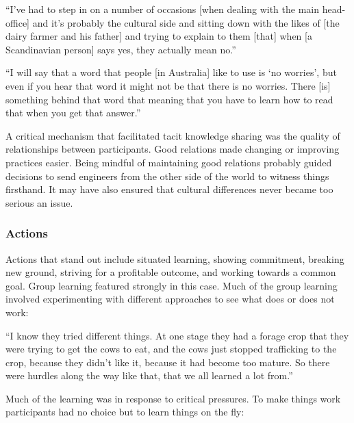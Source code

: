 \begin{displayquote}[Participant 18/2]
\small
\enquote{I've had to step in on a number of occasions [when dealing with the main head-office] and it's probably the cultural side and sitting down with the likes of [the dairy farmer and his father] and trying to explain to them [that] when [a Scandinavian person] says yes, they actually mean no.} 
\end{displayquote}


\begin{displayquote}[Participant 24/2]
\small
\enquote{I will say that a word that people [in Australia] like to use is \enquote{no worries}, but even if you hear that word it might not be that there is no worries. There [is] something behind that word that meaning that you have to learn how to read that when you get that answer.} 
\end{displayquote}


A critical mechanism that facilitated tacit knowledge sharing was the quality of relationships between participants. Good relations made changing or improving practices easier. Being mindful of maintaining good relations probably guided decisions to send engineers from the other side of the world to witness things firsthand. It may have also ensured that cultural differences never became too serious an issue. 

\subsubsection{Actions}

Actions that stand out include situated learning, showing commitment, breaking new ground, striving for a profitable outcome, and working towards a common goal. Group learning featured strongly in this case. Much of the group learning involved experimenting with different approaches to see what does or does not work:

\begin{displayquote}[Participant 8/2]
\small
\enquote{I know they tried different things. At one stage they had a forage crop that they were trying to get the cows to eat, and the cows just stopped trafficking to the crop, because they didn't like it, because it had become too mature. So there were hurdles along the way like that, that we all learned a lot from.} 
\end{displayquote}


Much of the learning was in response to critical pressures. To make things work participants had no choice but to learn things on the fly:

